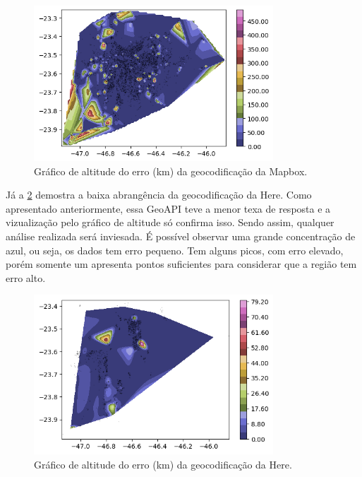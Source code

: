 \begin{figure}[h] 
  \centering
  \includegraphics[width=0.8\textwidth]{Figuras/graficoAltPontosMapbox.png}
  \caption{Gráfico de altitude do erro (km) da geocodificação da Mapbox.}
  \label{fig:grafAltM}
\end{figure}

Já a \ref{fig:grafAltH} demostra a baixa abrangência da geocodificação da Here. Como apresentado anteriormente, essa GeoAPI teve a menor texa de resposta e a vizualização pelo gráfico de altitude só confirma isso. Sendo assim, qualquer análise realizada será inviesada. É possível observar uma grande concentração de azul, ou seja, os dados tem erro pequeno. Tem alguns picos, com erro elevado, porém somente um apresenta pontos suficientes para considerar que a região tem erro alto. 

\begin{figure}[h]
  \centering
  \includegraphics[width=0.8\textwidth]{Figuras/graficoAltPontosHere.png}
  \caption{Gráfico de altitude do erro (km) da geocodificação da Here.}
  \label{fig:grafAltH}
\end{figure}

